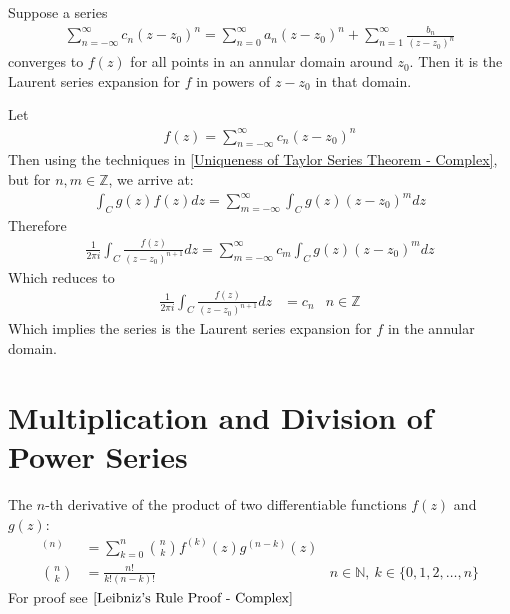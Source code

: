 \documentclass[12pt, english]{book}
\makeatletter
\renewenvironment{proof}[1][\proofname]{\par
	\pushQED{\qed}%
	\normalfont \topsep6\p@\@plus6\p@\relax
	\list{}{%
		\settowidth{\leftmargin}{\itshape\proofname:\hskip\labelsep}%
		\setlength{\labelwidth}{0pt}%
		\setlength{\itemindent}{-\leftmargin}%
		}%
	\item[\hskip\labelsep\itshape#1\@addpunct{:}]\ignorespaces
	}{\popQED\endlist\@endpefalse}
\makeatother
\begin{document}
	\begin{theorem}
		\label{Uniqueness of Laurent Series Theorem - Complex}
		Suppose a series 
		\begin{align*}
			\sum_{n=-\infty}^{\infty} c_n (z-z_0)^n
			= 	\sum_{n=0}^{\infty} a_n (z-z_0)^n +	\sum_{n=1}^{\infty} \frac{b_n}{(z-z_0)^n}
		\end{align*}
		converges to \(f(z)\) for all points in an annular domain around \(z_0\). Then it is the Laurent series expansion for \(f\) in powers of \(z-z_0\) in that domain. 
	\end{theorem}
	\begin{proof}
		Let 
		\begin{align*}
			f(z) = \sum_{n=-\infty}^{\infty} c_n (z-z_0)^n
		\end{align*}
		Then using the techniques in \cref{Uniqueness of Taylor Series Theorem - Complex}, but for \(n, m \in \mathbb{Z}\), we arrive at:
		\begin{align*}
			\int_{C} g(z) f(z) dz = \sum_{m=-\infty}^{\infty} \int_{C} g(z) (z-z_0)^m dz
		\end{align*}
		Therefore
		\begin{align*}
			\frac{1}{2\pi i} \int_{C} \frac{f(z)}{(z-z_0)^{n+1}} dz 
			= \sum_{m=-\infty}^{\infty} c_m \int_{C} g(z) (z-z_0)^m dz
		\end{align*}
		Which reduces to 
		\begin{align*}
			\frac{1}{2\pi i} \int_{C} \frac{f(z)}{(z-z_0)^{n+1}} dz &= c_n
				& n \in \mathbb{Z}
		\end{align*}
		Which implies the series is the Laurent series expansion for \(f\) in the annular domain.
	\end{proof}
	
	\section{Multiplication and Division of Power Series} \label{Multiplication and Division of Power Series Section - Complex}
	
	\begin{definition}
		\label{Leibniz's Rule Definition - Complex}
		The \(n\)-th derivative of the product of two differentiable functions \(f(z)\) and \(g(z)\):
		\begin{align*}
			[f(z)g(z)]^{(n)} &= \sum_{k=0}^{n} \binom{n}{k} f^{(k)}(z) g^{(n-k)}(z) \\
			\binom{n}{k} &= \frac{n!}{k!(n-k)!} & n \in \mathbb{N}, \ k \in \{0, 1, 2, \ldots, n\}
		\end{align*}
		For proof see \(\cref{Leibniz's Rule Proof - Complex}\)
	\end{definition}
	
\end{document}
